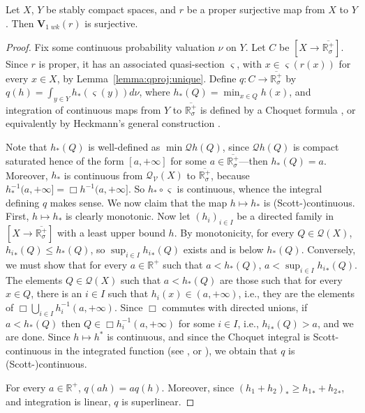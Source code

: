 \documentclass{LMCS}
\newcommand\Smyth{\mathcal Q}
\newcommand\V{{\mathcal V}}
\newcommand\SV{\Smyth_\V}
\newcommand\qs{\varsigma}
\newcommand\Val{\mathbf V}
\newcommand{\real}{\mathbb{R}}
\newcommand{\creal}{\overline{\real^+_\sigma}}
\begin{document}
\begin{prop}
  \label{prop:qretr:surj}
  Let $X$, $Y$ be stably compact spaces, and $r$ be a proper
  surjective map from $X$ to $Y$.  Then $\Val_{1\;wk} (r)$ is
  surjective.
\end{prop}
\begin{proof}
  Fix some continuous probability valuation $\nu$ on $Y$.  Let $C$ be
  $[X \to \creal]$.  Since $r$ is proper, it has an associated
  quasi-section $\qs$, with $x \in \qs (r (x))$ for every $x \in X$,
  by Lemma~\ref{lemma:qproj:unique}.  Define $q : C \to \creal$ by $q
  (h) = \int_{y \in Y} h_* (\qs (y)) d\nu$, where $h_* (Q) = \min_{x
    \in Q} h (x)$, and integration of continuous maps from $Y$ to
  $\creal$ is defined by a Choquet formula
  \cite{Tix:bewertung,JGL-icalp07}, or equivalently by Heckmann's
  general construction \cite{Heckmann:space:val}.

  Note that $h_* (Q)$ is well-defined as $\min \Smyth h (Q)$, since
  $\Smyth h (Q)$ is compact saturated hence of the form $[a, +\infty]$
  for some $a \in \creal$---then $h_* (Q)=a$.  Moreover, $h_*$ is
  continuous from $\SV (X)$ to $\creal$, because $h_*^{-1} (a,
  +\infty] = \Box h^{-1} (a, +\infty]$.  So $h_* \circ \qs$ is
  continuous, whence the integral defining $q$ makes sense.  We now
  claim that the map $h \mapsto h_*$ is (Scott-)continuous.  First, $h
  \mapsto h_*$ is clearly monotonic.  Now let ${(h_i)}_{i \in I}$ be a
  directed family in $[X \to \creal]$ with a least upper bound $h$.
  By monotonicity, for every $Q \in \Smyth (X)$, ${h_i}_* (Q) \leq h_*
  (Q)$, so $\sup_{i \in I} {h_i}_* (Q)$ exists and is below $h_* (Q)$.
  Conversely, we must show that for every $a \in \real^+$ such that $a
  < h_* (Q)$, $a < \sup_{i \in I} {h_i}_* (Q)$.  The elements $Q \in
  \Smyth (X)$ such that $a < h_* (Q)$ are those such that for every $x
  \in Q$, there is an $i \in I$ such that $h_i (x) \in (a, +\infty)$,
  i.e., they are the elements of $\Box \bigcup_{i \in I} h_i^{-1} (a,
  +\infty)$.  Since $\Box$ commutes with directed unions, if $a < h_*
  (Q)$ then $Q \in \Box h_i^{-1} (a, +\infty)$ for some $i \in I$,
  i.e., ${h_i}_* (Q) > a$, and we are done.  Since $h \mapsto h^*$ is
  continuous, and since the Choquet integral is Scott-continuous in
  the integrated function (see \cite[Satz~4.4]{Tix:bewertung}, or
  \cite[Theorem~7.1~(3)]{Heckmann:space:val}), we obtain that $q$ is
  (Scott-)continuous.

  For every $a \in \real^+$, $q (ah) = a q(h)$.  Moreover, since
  $(h_1+h_2)_* \geq {h_1}_* + {h_2}_*$, and integration is linear, $q$
  is superlinear.


\end{proof}
\end{document}

